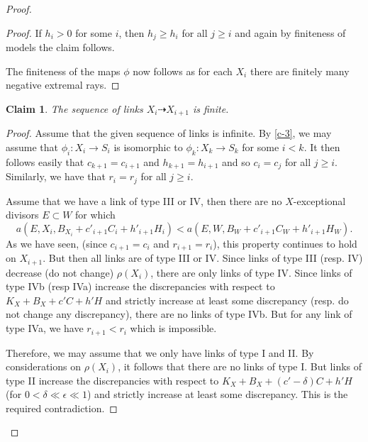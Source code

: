 \documentclass[12pt]{amsart}
\theoremstyle{plain}
\newtheorem{claim}[theorem]{Claim}
\begin{document}
\begin{proof}
\begin{proof}
If $h_i>0$ for some $i$, then $h_j\geq h_i$ for all $j\geq i$
and again by finiteness of models the claim follows.

The finiteness of the maps $\phi$ now follows as for each $X_i$ there are finitely many negative extremal rays.
\end{proof}
\begin{claim}The sequence of links $X_i\dasharrow X_{i+1}$ is finite.\end{claim}
\begin{proof} Assume that the given sequence of links is infinite.
By \eqref{c-3}, we may assume that $\phi _i:X_i\to S_i$ is isomorphic to $\phi _k:X_k\to S_k$ for some $i<k$. It then follows easily that
$c_{k+1}=c_{i+1}$ and $h_{k+1}=h_{i+1}$ and so $c_i=c_j$ for all $j\geq i$. 
Similarly, we have that $r_i=r_j$ for all $j\geq i$.

Assume that we have a link of type III or IV, then there are no $X$-exceptional divisors $E\subset W$ for which 
 $$a(E,X_i,B_{X_i}+c'_{i+1}C_i+h'_{i+1}H_i)< 
a(E,W,B_W+c'_{i+1}C_W+h'_{i+1}H_W).$$
As we have seen, (since $c_{i+1}=c_i$ and $r_{i+1}=r_i$), this property
continues to hold on $X_{i+1}$. But then all links are of type III or IV.
Since links of type III (resp. IV) decrease (do not change) $\rho (X_i)$,
there are only links of type IV.
Since links of type IVb (resp IVa) increase the discrepancies with respect 
to $K_X+B_X+c'C+h'H$ and strictly increase at least some discrepancy (resp.
do not change any discrepancy), there are no links of type IVb.
But for any link of type IVa, we have $r_{i+1}<r_i$ which is impossible.

Therefore, we may assume that we only have links of type I and II.
By considerations on $\rho (X_i)$, it follows that there are no links of type I. But links of type II increase the discrepancies with respect 
to $K_X+B_X+(c'-\delta)C+h'H$ (for $0<\delta \ll \epsilon \ll 1$)
and strictly increase at least some discrepancy.
This is the required contradiction.
\end{proof}


\end{proof}
\end{document}
